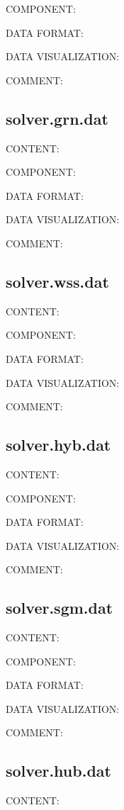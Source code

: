 {\color{green}COMPONENT:}

{\color{blue}DATA FORMAT:}

{\color{brown}DATA VISUALIZATION:}

{\color{purple}COMMENT:}

\subsection{solver.grn.dat}
{\color{red}CONTENT:}

{\color{green}COMPONENT:}

{\color{blue}DATA FORMAT:}

{\color{brown}DATA VISUALIZATION:}

{\color{purple}COMMENT:}

\subsection{solver.wss.dat}
{\color{red}CONTENT:}

{\color{green}COMPONENT:}

{\color{blue}DATA FORMAT:}

{\color{brown}DATA VISUALIZATION:}

{\color{purple}COMMENT:}

\subsection{solver.hyb.dat}
{\color{red}CONTENT:}

{\color{green}COMPONENT:}

{\color{blue}DATA FORMAT:}

{\color{brown}DATA VISUALIZATION:}

{\color{purple}COMMENT:}

\subsection{solver.sgm.dat}
{\color{red}CONTENT:}

{\color{green}COMPONENT:}

{\color{blue}DATA FORMAT:}

{\color{brown}DATA VISUALIZATION:}

{\color{purple}COMMENT:}

\subsection{solver.hub.dat}
{\color{red}CONTENT:}

